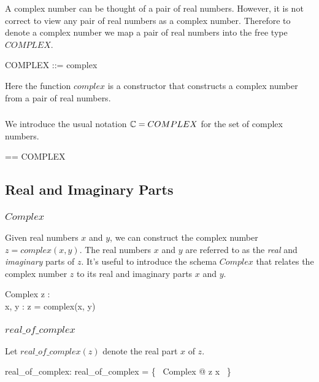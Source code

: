 \documentclass{amsart}
\begin{document}
A complex number can be thought of a pair of real numbers.
However, it is not correct to view any pair of real numbers as a complex number.
Therefore to denote a complex number we map a pair of real numbers
into the free type $COMPLEX$.

\begin{zed}
	COMPLEX ::= complex \ldata \Rtwo \rdata
\end{zed}

Here the function $complex$ is a constructor that constructs a
complex number from a pair of real numbers.

\subsubsection{}

We introduce the usual notation $\mathbb{C} = COMPLEX$ for the set of complex numbers.

\begin{zed}
\C == COMPLEX
\end{zed}

\subsection{Real and Imaginary Parts}

\subsubsection{$Complex$}

Given real numbers $x$ and $y$, we can construct the complex number
$z = complex(x,y)$.
The real numbers $x$ and $y$ are referred to as the \textit{real} and \textit{imaginary} parts of $z$.
It's useful to introduce the schema $Complex$ that relates the complex number $z$ to its
real and imaginary parts $x$ and $y$.

\begin{schema}{Complex}
	z : \C \\
	x, y : \R
\where
	z = complex(x, y)
\end{schema}

\subsubsection{$real\_of\_complex$}

Let $real\_of\_complex(z)$ denote the real part $x$ of $z$.

\begin{axdef}
	real\_of\_complex: \C \fun \R
\where
	real\_of\_complex = \{~ Complex @ z \mapsto x ~\}
\end{axdef}
\end{document}
